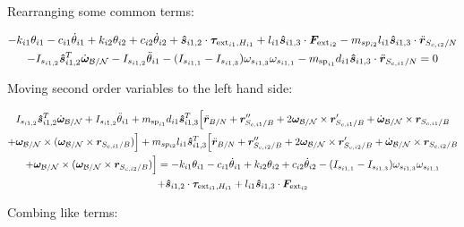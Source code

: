 \documentclass[paper]{aiaaNew}
\begin{document}
Rearranging some common terms:

\begin{multline}
	-k_{i1} \theta_{i1} - c_{i1} \dot{\theta}_{i1} + k_{i2} \theta_{i2} + c_{i2} \dot{\theta}_{i2} + \bm{\hat{s}}_{i1,2} \cdot \bm \tau_{\text{ext}_{i1},H_{i1}}  + l_{i1} \bm{\hat{s}}_{i1,3} \cdot \bm F_{\text{ext}_{i2}}  - m_{sp_{i2}} l_{i1} \bm{\hat{s}}_{i1,3} \cdot \ddot{\bm{r}}_{S_{c,i2}/N} \\
	- I_{s_{i1,2}} \bm{\hat{s}}_{i1,2}^T \dot{\bm \omega}_{\cal{B/N}} - I_{s_{i1,2}} \ddot{\theta}_{i1} - (I_{s_{i1,1}} - I_{s_{i1,3}}) \omega_{s_{i1,3}} \omega_{s_{i1,1}} -m_{\text{sp}_{i1}} d_{i1} \bm{\hat{s}}_{i1,3} \cdot \ddot{\bm{r}}_{S_{c,i1}/N} = 0
\end{multline}

Moving second order variables to the left hand side:

\begin{multline}
I_{s_{i1,2}} \bm{\hat{s}}_{i1,2}^T \dot{\bm \omega}_{\cal{B/N}} + I_{s_{i1,2}} \ddot{\theta}_{i1} + m_{\text{sp}_{i1}} d_{i1} \bm{\hat{s}}_{i1,3}^T \Big[\ddot{\bm{r}}_{B/N} + \bm{r}''_{S_{c,i1}/B} + 2 \bm\omega_{\cal B/N} \times \bm{r}'_{S_{c,i1}/B} +  \dot{\bm\omega}_{\cal B/N} \times \bm{r}_{S_{c,i1}/B} \\
+ \bm\omega_{\cal B/N} \times (\bm\omega_{\cal B/N} \times \bm{r}_{S_{c,i1}/B})\Big] + m_{sp_{i2}} l_{i1} \bm{\hat{s}}_{i1,3}^T \Big[\ddot{\bm{r}}_{B/N} + \bm{r}''_{S_{c,i2}/B} + 2 \bm\omega_{\cal B/N} \times \bm{r}'_{S_{c,i2}/B} +  \dot{\bm\omega}_{\cal B/N} \times \bm{r}_{S_{c,i2}/B} \\
+ \bm\omega_{\cal B/N} \times (\bm\omega_{\cal B/N} \times \bm{r}_{S_{c,i2}/B})\Big]
= -k_{i1} \theta_{i1} - c_{i1} \dot{\theta}_{i1} + k_{i2} \theta_{i2} + c_{i2} \dot{\theta}_{i2} - (I_{s_{i1,1}} - I_{s_{i1,3}}) \omega_{s_{i1,3}} \omega_{s_{i1,1}} \\
+ \bm{\hat{s}}_{i1,2} \cdot \bm \tau_{\text{ext}_{i1},H_{i1}}
+ l_{i1} \bm{\hat{s}}_{i1,3} \cdot \bm F_{\text{ext}_{i2}} 
\end{multline}

Combing like terms:
\end{document}
